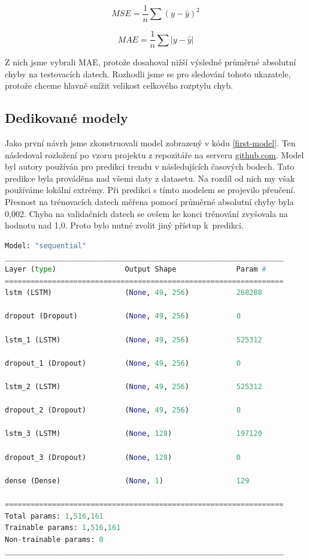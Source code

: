 \[MSE = \frac{1}{n}\sum (y-\hat{y})^2\]

\[MAE = \frac{1}{n}\sum |y-\hat{y}|\]

Z nich jsme vybrali MAE, protože dosahoval nižší výsledné průměrné absolutní chyby na testovacích datech.
Rozhodli jsme se pro sledování tohoto ukazatele, protože chceme hlavně snížit velikost celkového rozptylu chyb.

\subsection{Dedikované modely}

Jako první návrh jsme zkonstruovali model zobrazený v kódu \ref{first-model}. 
Ten následoval rozložení po vzoru projektu  \cite{predict-project} z repozitáře na serveru \url{github.com}.
Model byl autory používán pro predikci trendu v následujících časových bodech.
Tato predikce byla prováděna nad všemi daty z datasetu.
Na rozdíl od nich my však používáme lokální extrémy.
Při predikci s tímto modelem se projevilo přeučení.
Přesnost na trénovacích datech měřena pomocí průměrné absolutní chyby byla 0,002.
Chyba na validačních datech se ovšem ke konci trénování zvyšovala na hodnotu nad 1,0.
Proto bylo nutné zvolit jiný přístup k~predikci.

\begin{lstlisting}[caption={~1. model pro predikci},label=first-model,captionpos=t,float,abovecaptionskip=-\medskipamount,belowcaptionskip=\medskipamount,language=Python]
Model: "sequential"
_________________________________________________________________
Layer (type)                Output Shape              Param #   
=================================================================
lstm (LSTM)                 (None, 49, 256)           268288    

dropout (Dropout)           (None, 49, 256)           0         

lstm_1 (LSTM)               (None, 49, 256)           525312    

dropout_1 (Dropout)         (None, 49, 256)           0         

lstm_2 (LSTM)               (None, 49, 256)           525312    

dropout_2 (Dropout)         (None, 49, 256)           0         

lstm_3 (LSTM)               (None, 128)               197120    

dropout_3 (Dropout)         (None, 128)               0         

dense (Dense)               (None, 1)                 129       

=================================================================
Total params: 1,516,161
Trainable params: 1,516,161
Non-trainable params: 0
_________________________________________________________________
\end{lstlisting}

